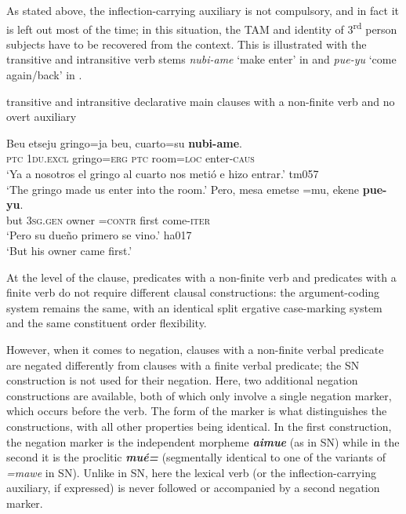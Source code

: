 \documentclass[output=paper]{langsci/langscibook}
\begin{document}
As stated above, the inflection-carrying auxiliary is not compulsory, and
in fact it is left out most of the time; in this situation, the TAM and
identity of 3\textsuperscript{rd} person subjects have to be recovered from
the context. This is illustrated with the transitive and intransitive verb
stems \textit{nubi-ame} `make enter' in  and
\textit{pue-yu} `come again\slash back' in
.

\begin{exe}\ex \label{ex:tacana-infinite-gringo-owner}  transitive and intransitive declarative main clauses with a non-finite verb and no overt auxiliary
\begin{xlist}
\ex\label{ex:tacana-infinite-gringo}
\gll  Beu  etseju
gringo=ja  beu,  cuarto=su
\textbf{nubi-ame}.
\\
    \textsc{ptc} \textsc{1du.excl} gringo=\textsc{erg} \textsc{ptc}
    room=\textsc{loc}  enter-\textsc{caus}\\
\glt `Ya a nosotros el gringo al cuarto nos metió e hizo entrar.' tm057\\
`The gringo made us enter into the room.'
\ex\label{ex:tacana-infinite-owner}
\gll Pero, mesa
emetse{\cb} =mu, ekene
\textbf{pue-yu}.\\
    but  \textsc{3sg.gen}  owner  =\textsc{contr}  first
    come-\textsc{iter}\\
\glt `Pero su dueño primero se vino.' ha017\\
`But his owner came first.'
\end{xlist}\end{exe}

At the level of the clause, predicates with a non-finite verb and predicates with a finite verb do not require different clausal constructions: the argument-coding system remains the same, with an identical split ergative case-marking system and the same constituent order flexibility.

However, when it comes to negation, clauses with a non-finite verbal
predicate are negated differently from clauses with a finite verbal
predicate; the SN construction is not used for their negation. Here, two
additional negation constructions are available, both of which only involve
a single negation marker, which occurs before the verb. The form of the
marker is what distinguishes the constructions, with all other properties
being identical. In the first construction, the negation marker is the
independent morpheme \textbf{\textit{aimue}} (as in SN) while in the
second it is the proclitic \textbf{\textit{mué=}} (segmentally identical
to one of the variants of \textit{=mawe} in SN). Unlike in SN, here the
lexical verb (or the inflection-carrying auxiliary, if expressed) is never
followed or accompanied by a second negation marker.
\end{document}
